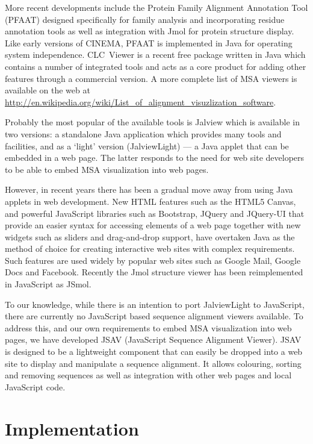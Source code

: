 \documentclass[a4]{bioinfo}
\begin{document}
More recent developments include the Protein Family Alignment
Annotation Tool (PFAAT)\cite{johnson:pfaat} designed specifically for
family analysis and incorporating residue annotation tools as well as
integration with Jmol for protein structure display. Like early
versions of CINEMA, PFAAT is implemented in Java for operating system
independence. CLC~Viewer is a recent free package written in Java
which contains a number of integrated tools and acts as a core product
for adding other features through a commercial version.  A more
complete list of MSA viewers is available on the web at
\url{http://en.wikipedia.org/wiki/List_of_alignment_visuzlization_software}.

Probably the most popular of the available tools is
Jalview\cite{clamp:jalview} which is available in two versions: a
standalone Java application which provides many tools and facilities,
and as a `light' version (JalviewLight) --- a Java applet that can be
embedded in a web page. The latter responds to the need for web site
developers to be able to embed MSA visualization into web pages.

However, in recent years there has been a gradual move away from using
Java applets in web development. New HTML features such as the HTML5
Canvas, and powerful JavaScript libraries such as Bootstrap, JQuery
and JQuery-UI that provide an easier syntax for accessing elements of
a web page together with new widgets such as sliders and drag-and-drop
support, have overtaken Java as the method of choice for creating
interactive web sites with complex requirements.  Such features are
used widely by popular web sites such as Google Mail, Google Docs and
Facebook.  Recently the Jmol structure viewer has been reimplemented
in JavaScript as JSmol.

To our knowledge, while there is an intention to port JalviewLight to
JavaScript, there are currently no JavaScript based sequence alignment
viewers available. To address this, and our own requirements to embed
MSA visualization into web pages, we have developed JSAV (JavaScript
Sequence Alignment Viewer). JSAV is designed to be a lightweight
component that can easily be dropped into a web site to display and
manipulate a sequence alignment. It allows colouring, sorting and
removing sequences as well as integration with other web pages and
local JavaScript code.



\section{Implementation}
\end{document}
